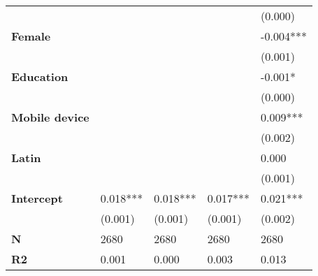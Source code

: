 \begin{tabular}{lllll}
                               &                &                &                &        (0.000) \\
\textbf{Female                        } &                &                &                &      -0.004*** \\
                               &                &                &                &        (0.001) \\
\textbf{Education                     } &                &                &                &        -0.001* \\
                               &                &                &                &        (0.000) \\
\textbf{Mobile device                 } &                &                &                &       0.009*** \\
                               &                &                &                &        (0.002) \\
\textbf{Latin                         } &                &                &                &          0.000 \\
                               &                &                &                &        (0.001) \\
\textbf{Intercept                     } &       0.018*** &       0.018*** &       0.017*** &       0.021*** \\
                               &        (0.001) &        (0.001) &        (0.001) &        (0.002) \\
\textbf{N                             } &           2680 &           2680 &           2680 &           2680 \\
\textbf{R2                            } &          0.001 &          0.000 &          0.003 &          0.013 \\
\bottomrule
\end{tabular}
